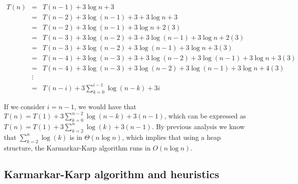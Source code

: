 \documentclass[tikz, 12pt]{scrartcl}
\begin{document}
\begin{eqnarray}
T(n)	&	=		&	T(n - 1) + 3 \log n + 3 \nonumber \\
		&	=		&	T(n - 2) + 3 \log(n - 1) + 3 + 3\log n + 3 \nonumber \\
		&	=		&	T(n - 2) + 3 \log(n - 1) + 3\log n + 2(3) \nonumber \\
		&	=		&	T(n - 3) + 3 \log(n - 2) + 3 + 3 \log(n - 1) + 3\log n + 2(3) \nonumber \\
		&	=		&	T(n - 3) + 3 \log(n - 2) + 3 \log(n - 1) + 3\log n + 3 (3) \nonumber \\
		&	=		&	T(n - 4) + 3 \log(n - 3) + 3  + 3 \log(n - 2) + 3 \log(n - 1) + 3\log n + 3 (3) \nonumber \\
		&	=		&	T(n - 4)	 + 3\log(n - 3)  + 3 \log(n - 2) + 3 \log(n - 1) + 3\log n + 4 (3) \nonumber \\
		&	\vdots	& \nonumber \\
		&	=		&	T(n - i) + 3 \sum_{k = 0}^{i-1} \log(n - k)  + 3i \label{generalRecurrenceKK}
\end{eqnarray}

If we consider $i = n - 1$, we would have that $T(n) = T(1) +  3 \sum_{k = 0}^{n-2} \log(n - k)  + 3(n - 1)$, which can be expressed as $T(n) = T(1) +  3 \sum_{k = 2}^{n} \log(k)  + 3(n - 1)$. By previous analysis we know that $\sum_{k = 2}^{n} \log(k) $ is in $\Theta(n \log n)$, which implies that using a heap structure, the Karmarkar-Karp algorithm runs in $O(n \log n)$.

\subsection{Karmarkar-Karp algorithm and heuristics}
\end{document}
